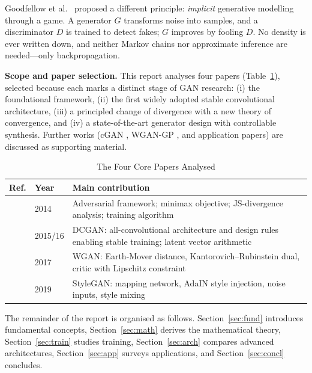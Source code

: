 \documentclass[conference]{IEEEtran}
\theoremstyle{plain}
\theoremstyle{definition}
\begin{document}
Goodfellow et al.\ \cite{goodfellow2014gan} proposed a different principle: \emph{implicit} generative modelling through a game. A generator $G$ transforms noise into samples, and a discriminator $D$ is trained to detect fakes; $G$ improves by fooling $D$. No density is ever written down, and neither Markov chains nor approximate inference are needed---only backpropagation.

\textbf{Scope and paper selection.} This report analyses four papers (Table~\ref{tab:papers}), selected because each marks a distinct stage of GAN research: (i) the foundational framework, (ii) the first widely adopted stable convolutional architecture, (iii) a principled change of divergence with a new theory of convergence, and (iv) a state-of-the-art generator design with controllable synthesis. Further works (cGAN \cite{mirza2014cgan}, WGAN-GP \cite{gulrajani2017wgangp}, and application papers) are discussed as supporting material.

\begin{table}[t]
\centering
\caption{The Four Core Papers Analysed}
\label{tab:papers}
\footnotesize
\begin{tabular}{@{}p{0.9cm}p{1.4cm}p{4.9cm}@{}}
\toprule
\textbf{Ref.} & \textbf{Year} & \textbf{Main contribution} \\
\midrule
\cite{goodfellow2014gan} & 2014 & Adversarial framework; minimax objective; JS-divergence analysis; training algorithm \\
\cite{radford2016dcgan} & 2015/16 & DCGAN: all-convolutional architecture and design rules enabling stable training; latent vector arithmetic \\
\cite{arjovsky2017wgan} & 2017 & WGAN: Earth-Mover distance, Kantorovich--Rubinstein dual, critic with Lipschitz constraint \\
\cite{karras2019stylegan} & 2019 & StyleGAN: mapping network, AdaIN style injection, noise inputs, style mixing \\
\bottomrule
\end{tabular}
\end{table}

The remainder of the report is organised as follows. Section~\ref{sec:fund} introduces fundamental concepts, Section~\ref{sec:math} derives the mathematical theory, Section~\ref{sec:train} studies training, Section~\ref{sec:arch} compares advanced architectures, Section~\ref{sec:app} surveys applications, and Section~\ref{sec:concl} concludes.

\end{document}
